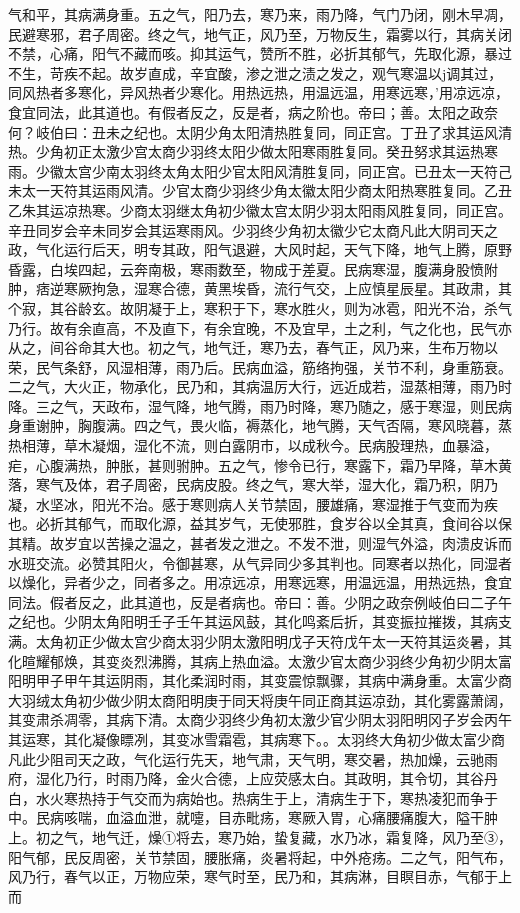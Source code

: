 \documentclass[a4paper,12pt,UTF8,twoside]{ctexbook}
\begin{document}
气和平，其病满身重。五之气，阳乃去，寒乃来，雨乃降，气门乃闭，刚木早凋，民避寒邪，君子周密。终之气，地气正，风乃至，万物反生，霜雾以行，其病关闭不禁，心痛，阳气不藏而咳。抑其运气，赞所不胜，必折其郁气，先取化源，暴过不生，苛疾不起。故岁直成，辛宜酸，渗之泄之渍之发之，观气寒温以j调其过，同风热者多寒化，异风热者少寒化。用热远热，用温远温，用寒远寒，’用凉远凉，食宜同法，此其道也。有假者反之，反是者，病之阶也。帝曰；善。太阳之政奈何？岐伯曰：丑未之纪也。太阴少角太阳清热胜复同，同正宫。丁丑了求其运风清热。少角初正太激少宫太商少羽终太阳少做太阳寒雨胜复同。癸丑努求其运热寒雨。少徽太宫少南太羽终太角太阳少官太阳风清胜复同，同正宫。已丑太一天符己未太一天符其运雨风清。少官太商少羽终少角太徽太阳少商太阳热寒胜复同。乙丑乙朱其运凉热寒。少商太羽继太角初少徽太宫太阴少羽太阳雨风胜复同，同正宫。辛丑同岁会辛未同岁会其运寒雨风。少羽终少角初太徽少它太商凡此大阴司天之政，气化运行后天，明专其政，阳气退避，大风时起，天气下降，地气上腾，原野昏露，白埃四起，云奔南极，寒雨数至，物成于差夏。民病寒湿，腹满身股愤附肿，痞逆寒厥拘急，湿寒合德，黄黑埃昏，流行气交，上应慎星辰星。其政肃，其个寂，其谷龄玄。故阴凝于上，寒积于下，寒水胜火，则为冰雹，阳光不治，杀气乃行。故有余直高，不及直下，有余宜晚，不及宜早，土之利，气之化也，民气亦从之，间谷命其大也。初之气，地气迁，寒乃去，春气正，风乃来，生布万物以荣，民气条舒，风湿相薄，雨乃后。民病血溢，筋络拘强，关节不利，身重筋衰。二之气，大火正，物承化，民乃和，其病温厉大行，远近成若，湿蒸相薄，雨乃时降。三之气，天政布，湿气降，地气腾，雨乃时降，寒乃随之，感于寒湿，则民病身重谢肿，胸腹满。四之气，畏火临，褥蒸化，地气腾，天气否隔，寒风晓暮，蒸热相薄，草木凝烟，湿化不流，则白露阴市，以成秋今。民病股理热，血暴溢，疟，心腹满热，肿胀，甚则驸肿。五之气，惨令已行，寒露下，霜乃早降，草木黄落，寒气及体，君子周密，民病皮股。终之气，寒大举，湿大化，霜乃积，阴乃凝，水坚冰，阳光不治。感于寒则病人关节禁固，腰雄痛，寒湿推于气变而为疾也。必折其郁气，而取化源，益其岁气，无使邪胜，食岁谷以全其真，食间谷以保其精。故岁宜以苦操之温之，甚者发之泄之。不发不泄，则湿气外溢，肉溃皮诉而水班交流。必赞其阳火，令御甚寒，从气异同少多其判也。同寒者以热化，同湿者以燥化，异者少之，同者多之。用凉远凉，用寒远寒，用温远温，用热远热，食宜同法。假者反之，此其道也，反是者病也。帝曰：善。少阴之政奈例岐伯曰二子午之纪也。少阴太角阳明壬子壬午其运风鼓，其化鸣紊后折，其变振拉摧拨，其病支满。太角初正少做太宫少商太羽少阴太激阳明戊子天符戊午太一天符其运炎暑，其化暄耀郁焕，其变炎烈沸腾，其病上热血溢。太激少官太商少羽终少角初少阴太富阳明甲子甲午其运阴雨，其化柔润时雨，其变震惊飘骤，其病中满身重。太富少商大羽绒太角初少做少阴太商阳明庚于同天将庚午同正商其运凉劲，其化雾露萧阔，其变肃杀凋零，其病下清。太商少羽终少角初太激少官少阴太羽阳明冈子岁会丙午其运寒，其化凝像瞟冽，其变冰雪霜雹，其病寒下。。太羽终大角初少做太富少商凡此少阻司天之政，气化运行先天，地气肃，天气明，寒交暑，热加燥，云驰雨府，湿化乃行，时雨乃降，金火合德，上应荧感太白。其政明，其令切，其谷丹白，水火寒热持于气交而为病始也。热病生于上，清病生于下，寒热凌犯而争于中。民病咳喘，血溢血泄，就嚏，目赤毗疡，寒厥入胃，心痛腰痛腹大，隘干肿上。初之气，地气迁，燥①将去，寒乃始，蛰复藏，水乃冰，霜复降，风乃至③，阳气郁，民反周密，关节禁固，腰胀痛，炎暑将起，中外疮疡。二之气，阳气布，风乃行，春气以正，万物应荣，寒气时至，民乃和，其病淋，目瞑目赤，气郁于上而
\end{document}
